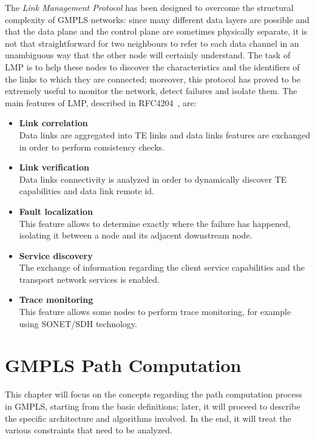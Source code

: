 \documentclass[10pt,a4paper]{report}
\begin{document}
The \textit{Link Management Protocol} has been designed to overcome
the structural complexity of GMPLS networks: since many different data
layers are possible and that the data plane and the control plane are
sometimes physically separate, it is not that straightforward for two
neighbours to refer to each data channel in an unambiguous way that
the other node will certainly understand. The task of LMP is to help
these nodes to discover the characteristics and the identifiers of the
links to which they are connected; moreover, this protocol has proved
to be extremely useful to monitor the network, detect failures and
isolate them. The main features of LMP, described in
RFC4204~\cite{rfc4204}, are:
\begin{itemize}
\item \textbf{Link correlation} \\
  Data links are aggregated into TE links and data links features are
  exchanged in order to perform consistency checks.
\item \textbf{Link verification} \\
  Data links connectivity is analyzed in order to dynamically discover
  TE capabilities and data link remote id.
\item \textbf{Fault localization} \\
  This feature allows to determine exactly where the failure has
  happened, isolating it between a node and its adjacent downstream
  node.
\item \textbf{Service discovery} \\
  The exchange of information regarding the client service
  capabilities and the transport network services is enabled.
\item \textbf{Trace monitoring} \\
  This feature allows some nodes to perform trace monitoring, for
  example using SONET/SDH technology.
\end{itemize}

\clearpage
\mbox{}
\clearpage

\chapter{GMPLS Path Computation}\label{sec:gmplspath}

This chapter will focus on the concepts regarding the path computation
process in GMPLS, starting from the basic definitions; later, it will
proceed to describe the specific architecture and algorithms
involved. In the end, it will treat the various constraints that need
to be analyzed.
\end{document}
